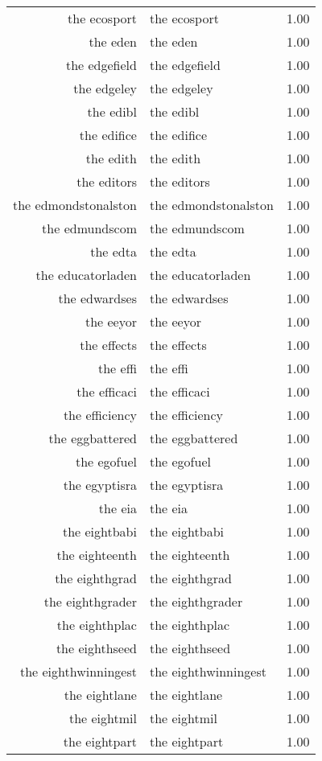 \begin{table}[ht]
\begin{tabular}{rlr}
  the ecosport & the ecosport & 1.00 \\ 
  the eden & the eden & 1.00 \\ 
  the edgefield & the edgefield & 1.00 \\ 
  the edgeley & the edgeley & 1.00 \\ 
  the edibl & the edibl & 1.00 \\ 
  the edifice & the edifice & 1.00 \\ 
  the edith & the edith & 1.00 \\ 
  the editors & the editors & 1.00 \\ 
  the edmondstonalston & the edmondstonalston & 1.00 \\ 
  the edmundscom & the edmundscom & 1.00 \\ 
  the edta & the edta & 1.00 \\ 
  the educatorladen & the educatorladen & 1.00 \\ 
  the edwardses & the edwardses & 1.00 \\ 
  the eeyor & the eeyor & 1.00 \\ 
  the effects & the effects & 1.00 \\ 
  the effi & the effi & 1.00 \\ 
  the efficaci & the efficaci & 1.00 \\ 
  the efficiency & the efficiency & 1.00 \\ 
  the eggbattered & the eggbattered & 1.00 \\ 
  the egofuel & the egofuel & 1.00 \\ 
  the egyptisra & the egyptisra & 1.00 \\ 
  the eia & the eia & 1.00 \\ 
  the eightbabi & the eightbabi & 1.00 \\ 
  the eighteenth & the eighteenth & 1.00 \\ 
  the eighthgrad & the eighthgrad & 1.00 \\ 
  the eighthgrader & the eighthgrader & 1.00 \\ 
  the eighthplac & the eighthplac & 1.00 \\ 
  the eighthseed & the eighthseed & 1.00 \\ 
  the eighthwinningest & the eighthwinningest & 1.00 \\ 
  the eightlane & the eightlane & 1.00 \\ 
  the eightmil & the eightmil & 1.00 \\ 
  the eightpart & the eightpart & 1.00 \\ 

\end{tabular}
\end{table}
